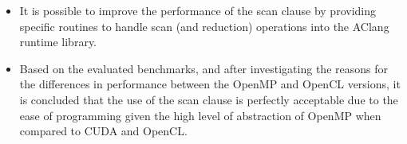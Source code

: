\documentclass[Ingles]{ic-tese-v1}
\begin{document}
\begin{itemize}
	\item It is possible to improve  the performance of the scan clause by
	providing specific routines to handle scan (and reduction) operations 
	into the AClang  runtime  library.
	\item Based on the evaluated benchmarks, and after investigating the
	reasons for the differences in performance between the OpenMP and
	OpenCL versions, it is concluded that the use of the scan clause is
	perfectly acceptable due to the ease of programming given the high
	level of abstraction of OpenMP when compared to CUDA and OpenCL. 
\end{itemize}

	




\end{document}
